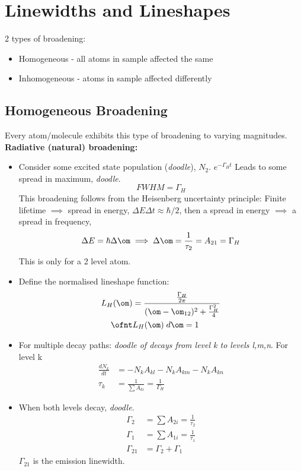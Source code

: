 \documentclass[a4paper, 11pt, normalem]{report}
\begin{document}
\chapter{Linewidths and Lineshapes}
2 types of broadening:
\begin{itemize}
    \item Homogeneous - all atoms in sample affected the same
    \item Inhomogeneous - atoms in sample affected differently
\end{itemize}

\section{Homogeneous Broadening}
Every atom/molecule exhibits this type of broadening to varying magnitudes.\\
\textbf{Radiative (natural) broadening:}
\begin{itemize}
    \item Consider some excited state population (\textit{doodle}), $N_2$. $e^{-\Gamma_Ht}$
        Leads to some spread in maximum, \textit{doodle}.
        \begin{equation}
            FWHM = \Gamma_H
        \end{equation}
        This broadening follows from the Heisenberg uncertainty principle: Finite lifetime $\implies$ spread in energy, $\Delta E\Delta t \approx \hbar/2$, then a spread in energy $\implies$ a spread in frequency,
        \begin{equation}
            \Delta E = \hbar\Delta\om \implies \Delta\om = \frac{1}{\tau_2} = A_{21} = \Gamma_H
        \end{equation}
        This is only for a 2 level atom.
    \item Define the normalised lineshape function:
        \begin{align}
            L_H(\om) &= \frac{\frac{\Gamma_H}{2\pi}}{(\om-\om_{12})^2+\frac{\Gamma_H^2}{4}} \\
            \ofnt &L_H(\om)\;d\om = 1
        \end{align}
    \item For multiple decay paths: \textit{doodle of decays from level k to levels l,m,n}.
        For level k
        \begin{align}
            \frac{dN_k}{dt} &= -N_kA_{kl} - N_kA_{km} - N_kA_{kn} \\
            \tau_k &= \frac{1}{\sum A_{ki}} = \frac{1}{\Gamma_H}
        \end{align}
    \item When both levels decay, \textit{doodle}.
        \begin{align}
            \Gamma_2 &= \sum A_{2i} = \frac{1}{\tau_2} \\
            \Gamma_1 &= \sum A_{1i} = \frac{1}{\tau_1} \\
            \Gamma_{21} &= \Gamma_2 + \Gamma_1
        \end{align}
        $\Gamma_{21}$ is the emission linewidth. 
\end{itemize}
\end{document}
